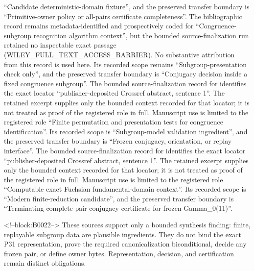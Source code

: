 \documentclass[11pt]{article}
\begin{document}
``Candidate deterministic-domain fixture'', and the preserved transfer boundary is ``Primitive-owner policy or all-pairs certificate completeness''.
The bibliographic record \citep{P31-S04} remains metadata-identified and
prospectively coded for ``Congruence-subgroup recognition algorithm context'', but the bounded source-finalization
run retained no inspectable exact passage (WILEY\_FULL\_TEXT\_ACCESS\_BARRIER).  No substantive
attribution from this record is used here.  Its recorded scope remains
``Subgroup-presentation check only'', and the preserved transfer boundary is ``Conjugacy decision inside a fixed congruence subgroup''.
The bounded source-finalization record for \citep{P31-S05} identifies
the exact locator ``publisher-deposited Crossref abstract, sentence 1''.  The retained excerpt supplies only the
bounded context recorded for that locator; it is not treated as proof of the
registered role in full.  Manuscript use is limited to the registered role ``Finite permutation and presentation tests for congruence identification''.
Its recorded scope is ``Subgroup-model validation ingredient'', and the preserved
transfer boundary is ``Frozen conjugacy, orientation, or replay interface''.
The bounded source-finalization record for \citep{P31-S06} identifies
the exact locator ``publisher-deposited Crossref abstract, sentence 1''.  The retained excerpt supplies only the
bounded context recorded for that locator; it is not treated as proof of the
registered role in full.  Manuscript use is limited to the registered role ``Computable exact Fuchsian fundamental-domain context''.
Its recorded scope is ``Modern finite-reduction candidate'', and the preserved
transfer boundary is ``Terminating complete pair-conjugacy certificate for frozen Gamma\_0(11)''.

<!--block:B0022-->
These sources support only a bounded synthesis finding: finite,
replayable subgroup data are plausible ingredients. They do not bind the
exact P31 representation, prove the required canonicalization
biconditional, decide any frozen pair, or define owner bytes.
Representation, decision, and certification remain distinct obligations.
\end{document}

